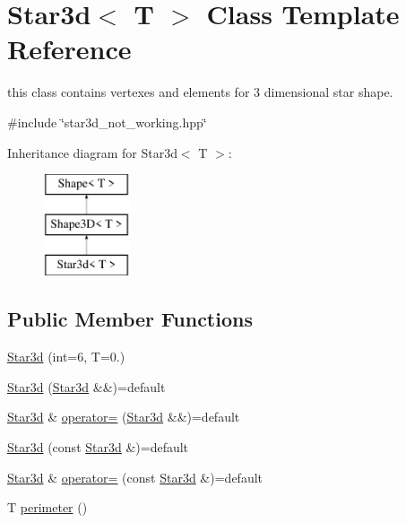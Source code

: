 \hypertarget{classStar3d}{}\section{Star3d$<$ T $>$ Class Template Reference}
\label{classStar3d}


this class contains vertexes and elements for 3 dimensional star shape.  




{\ttfamily \#include \char`\"{}star3d\+\_\+not\+\_\+working.\+hpp\char`\"{}}

Inheritance diagram for Star3d$<$ T $>$\+:\begin{figure}[H]
\begin{center}
\leavevmode
\includegraphics[height=3.000000cm]{classStar3d}
\end{center}
\end{figure}
\subsection*{Public Member Functions}
\begin{DoxyCompactItemize}
\item 
\mbox{\hyperlink{classStar3d_ad264da858df1ef77144a4cd7345185da}{Star3d}} (int=6, T=0.)
\item 
\mbox{\hyperlink{classStar3d_a6793481605da65706c5fc9ca1d4b82ad}{Star3d}} (\mbox{\hyperlink{classStar3d}{Star3d}} \&\&)=default
\item 
\mbox{\hyperlink{classStar3d}{Star3d}} \& \mbox{\hyperlink{classStar3d_a35ace37c66d10033bef1d0acaf9f3283}{operator=}} (\mbox{\hyperlink{classStar3d}{Star3d}} \&\&)=default
\item 
\mbox{\hyperlink{classStar3d_a5f4b217dd7926f73faaa57766546b022}{Star3d}} (const \mbox{\hyperlink{classStar3d}{Star3d}} \&)=default
\item 
\mbox{\hyperlink{classStar3d}{Star3d}} \& \mbox{\hyperlink{classStar3d_a6e1939003aedebc06efdb51404dfbadd}{operator=}} (const \mbox{\hyperlink{classStar3d}{Star3d}} \&)=default
\item 
T \mbox{\hyperlink{classStar3d_aac560f44b7b7d278781231fbaf8312e1}{perimeter}} ()
\end{DoxyCompactItemize}

